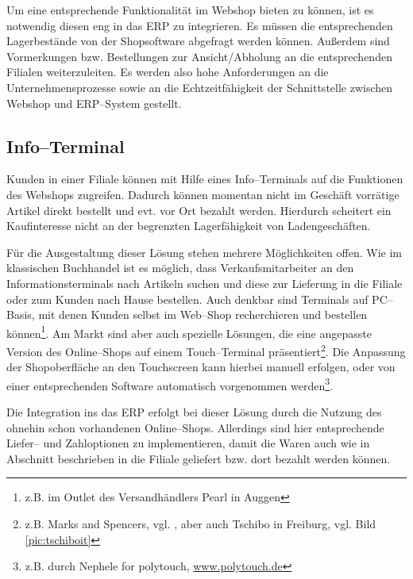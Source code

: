 Um eine entsprechende Funktionalität im Webshop bieten zu können, ist es notwendig diesen eng in das \ac{ERP} zu integrieren. Es müssen die entsprechenden Lagerbestände von der Shopsoftware abgefragt werden können. Außerdem sind Vormerkungen bzw. Bestellungen zur Ansicht/Abholung an die entsprechenden Filialen weiterzuleiten.  Es werden also hohe Anforderungen an die Unternehmensprozesse sowie an die Echtzeitfähigkeit der Schnittstelle zwischen Webshop und ERP--System gestellt.

\subsection{Info--Terminal}

Kunden in einer Filiale können mit Hilfe eines Info–Terminals auf die Funktionen des Webshops zugreifen. Dadurch können momentan nicht im Geschäft vorrätige Artikel direkt bestellt und evt. vor Ort bezahlt werden. Hierdurch scheitert ein Kaufinteresse nicht an der begrenzten Lagerfähigkeit von Ladengeschäften.

Für die Ausgestaltung dieser Lösung stehen mehrere Möglichkeiten offen. Wie im klassischen Buchhandel ist es möglich, dass Verkaufsmitarbeiter an den Informationsterminals nach Artikeln suchen und diese zur Lieferung in die Filiale oder zum Kunden nach Hause bestellen. Auch denkbar sind Terminals auf PC–Basis, mit denen Kunden selbst im Web–Shop recherchieren und bestellen können\footnote{z.B. im Outlet des Versandhändlers Pearl in Auggen}. Am Markt sind aber auch spezielle Lösungen, die eine angepasste Version des Online–Shops auf einem Touch–Terminal präsentiert\footnote{z.B. Marks and Spencers, vgl. \cite{intelms}, aber auch Tschibo in Freiburg, vgl. Bild \ref{pic:tschiboit}}. Die Anpassung der Shop\-ober\-fläche an den Touchscreen kann hierbei manuell erfolgen, oder von einer entsprechenden Software automatisch vorgenommen werden\footnote{z.B. durch Nephele for polytouch, \url{www.polytouch.de}}.

Die Integration ins das \ac{ERP} erfolgt bei dieser Lösung durch die Nutzung des ohnehin schon vorhandenen Online–Shops. Allerdings sind hier entsprechende Liefer-- und Zahloptionen zu implementieren, damit die Waren auch wie in Abschnitt  beschrieben in die Filiale geliefert bzw. dort bezahlt werden können. 

